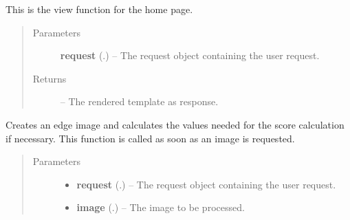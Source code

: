 \documentclass[letterpaper,10pt,english]{sphinxmanual}
\begin{document}
\begin{fulllineitems}
\label{Contour.contour:Contour.contour.views.index}
This is the view function for the home page.
\begin{quote}\begin{description}
\item[{Parameters}] \leavevmode
\textbf{request} (.) -- The request object containing the user request.

\item[{Returns}] \leavevmode
{} -- The rendered template as response.

\end{description}\end{quote}

\end{fulllineitems}


\begin{fulllineitems}
\label{Contour.contour:Contour.contour.views.process_image}
Creates an edge image and calculates the values needed for the score calculation if necessary. This function is called as soon as an image is requested.
\begin{quote}\begin{description}
\item[{Parameters}] \leavevmode\begin{itemize}
\item {} 
\textbf{request} (.) -- The request object containing the user request.

\item {} 
\textbf{image} (.) -- The image to be processed.

\end{itemize}

\end{description}\end{quote}

\end{fulllineitems}

\end{document}
